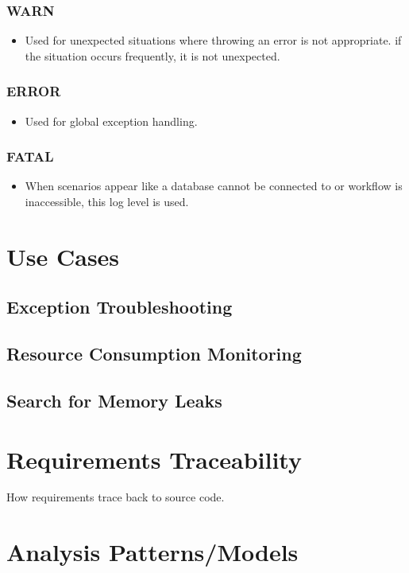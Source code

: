 \documentclass[12pt]{report}
\begin{document}
\subsubsection{WARN}
\begin{itemize}
  \item Used for unexpected situations where throwing an error is not appropriate. if the situation occurs frequently, it is not unexpected.
\end{itemize}

\subsubsection{ERROR}
\begin{itemize}
  \item Used for global exception handling.
\end{itemize}

\subsubsection{FATAL}
\begin{itemize}
  \item When scenarios appear like a database cannot be connected to or workflow is inaccessible, this log level is used.
\end{itemize}

\section{Use Cases}
\subsection{Exception Troubleshooting}
\subsection{Resource Consumption Monitoring}
\subsection{Search for Memory Leaks}
\section{Requirements Traceability}
How requirements trace back to source code.
\section{Analysis Patterns/Models}
\end{document}
